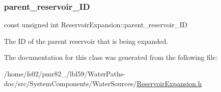 \subsubsection{\texorpdfstring{parent\+\_\+reservoir\+\_\+\+ID}{parent\_reservoir\_ID}}
{\footnotesize\ttfamily const unsigned int Reservoir\+Expansion\+::parent\+\_\+reservoir\+\_\+\+ID}



The ID of the parent reservoir that is being expanded. 



The documentation for this class was generated from the following file\+:\begin{DoxyCompactItemize}
\item 
/home/fs02/pmr82\+\_/lbl59/\+Water\+Paths-\/doc/src/\+System\+Components/\+Water\+Sources/\mbox{\hyperlink{ReservoirExpansion_8h}{Reservoir\+Expansion.\+h}}\end{DoxyCompactItemize}
